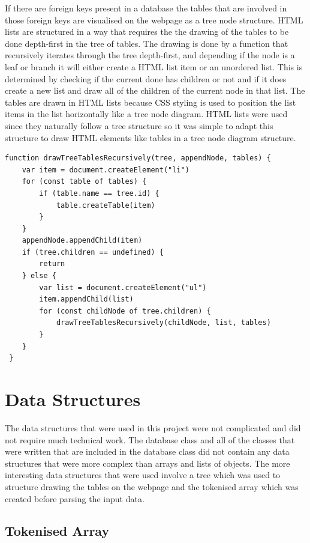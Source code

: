 If there are foreign keys present in a database the tables that are involved in those foreign keys are visualised on the webpage as a tree node structure. HTML lists are structured in a way that requires the the drawing of the tables to be done depth-first in the tree of tables. The drawing is done by a function that recursively iterates through the tree depth-first, and depending if the node is a leaf or branch it will either create a HTML list item or an unordered list. This is determined by checking if the current done has children or not and if it does create a new list and draw all of the children of the current node in that list. The tables are drawn in HTML lists because CSS styling is used to position the list items in the list horizontally like a tree node diagram. HTML lists were used since they naturally follow a tree structure so it was simple to adapt this structure to draw HTML elements like tables in a tree node diagram structure. 

 \begin{lstlisting}[style=JavaScript, caption={JavaScript function draw a list of tables recursively while also creating HTML list elements to be structured on the webpage.}]
 function drawTreeTablesRecursively(tree, appendNode, tables) {
 	var item = document.createElement("li")
 	for (const table of tables) {
 		if (table.name == tree.id) {
 			table.createTable(item)
 		}
 	}
 	appendNode.appendChild(item)
 	if (tree.children == undefined) {
 		return
 	} else {
 		var list = document.createElement("ul")
 		item.appendChild(list)
 		for (const childNode of tree.children) {
 			drawTreeTablesRecursively(childNode, list, tables)
 		}
 	}
 }
\end{lstlisting}

\section{Data Structures}

The data structures that were used in this project were not complicated and did not require much technical work. The database class and all of the classes that were written that are included in the database class did not contain any data structures that were more complex than arrays and lists of objects. The more interesting data structures that were used involve a tree which was used to structure drawing the tables on the webpage and the tokenised array which was created before parsing the input data.

\subsection{Tokenised Array}

